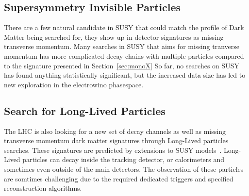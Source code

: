 \subsection{Supersymmetry Invisible Particles}
There are a few natural candidate in SUSY that could match the profile of Dark Matter being searched for, they show up in detector signatures as missing transverse momentum. Many searches in SUSY that aims for missing tranverse momentum has more complicated decay chains with multiple particles compared to the signature presented in Section~\ref{sec:monoX}
So far, no searches on SUSY has found anything statistically significant, but the increased data size has led to new exploration in the electrowino phasespace.

\subsection{Search for Long-Lived Particles}
The LHC is also looking for a new set of decay channels as well as missing transverse momentum dark matter signatures through Long-Lived particles searches. These signatures are predicted by extensions to SUSY models~\cite{LongLived2020}. Long-Lived particles can decay inside the tracking detector, or calorimeters and sometimes even outside of the main detectors. The observation of these particles are somtimes challenging due to the required dedicated triggers and specified reconstruction algorithms. 





